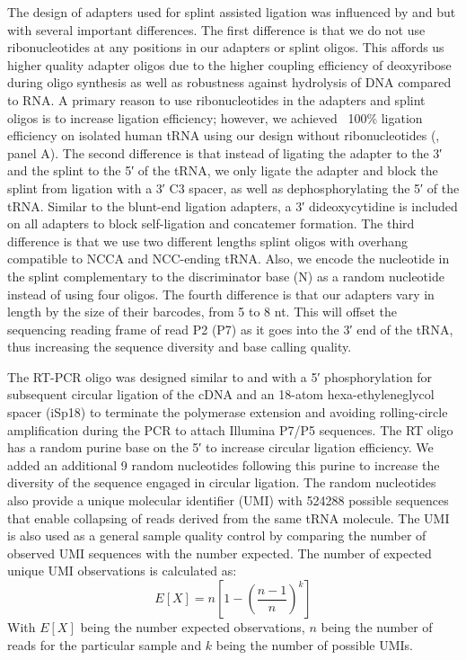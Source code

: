 \documentclass[9pt,lineno]{elife}
\begin{document}
The design of adapters used for splint assisted ligation was influenced by \cite{Smith2015-ht} and \cite{Shigematsu2017-tv} but with several important differences.
The first difference is that we do not use ribonucleotides at any positions in our adapters or splint oligos.
This affords us higher quality adapter oligos due to the higher coupling efficiency of deoxyribose during oligo synthesis as well as robustness against hydrolysis of DNA compared to RNA.
A primary reason to use ribonucleotides in the adapters and splint oligos is to increase ligation efficiency; however, we achieved ~100\% ligation efficiency on isolated human tRNA using our design without ribonucleotides (, panel A).
The second difference is that instead of ligating the adapter to the 3′ and the splint to the 5′ of the tRNA, we only ligate the adapter and block the splint from ligation with a 3′ C3 spacer, as well as dephosphorylating the 5′ of the tRNA.
Similar to the blunt-end ligation adapters, a 3′ dideoxycytidine is included on all adapters to block self-ligation and concatemer formation.
The third difference is that we use two different lengths splint oligos with overhang compatible to NCCA and NCC-ending tRNA.
Also, we encode the nucleotide in the splint complementary to the discriminator base (N) as a random nucleotide instead of using four oligos.
The fourth difference is that our adapters vary in length by the size of their barcodes, from 5 to 8 nt.
This will offset the sequencing reading frame of read P2 (P7) as it goes into the 3′ end of the tRNA, thus increasing the sequence diversity and base calling quality.

The RT-PCR oligo was designed similar to \cite{McGlincy2017-ro} and \cite{Behrens2021-gb} with a 5′ phosphorylation for subsequent circular ligation of the cDNA and an 18-atom hexa-ethyleneglycol spacer (iSp18) to terminate the polymerase extension and avoiding rolling-circle amplification during the PCR to attach Illumina P7/P5 sequences.
The RT oligo has a random purine base on the 5′ to increase circular ligation efficiency.
We added an additional 9 random nucleotides following this purine to increase the diversity of the sequence engaged in circular ligation.
The random nucleotides also provide a unique molecular identifier (UMI) with 524288 possible sequences that enable collapsing of reads derived from the same tRNA molecule.
The UMI is also used as a general sample quality control by comparing the number of observed UMI sequences with the number expected.
The number of expected unique UMI observations is calculated as:
\begin{equation}
E[X] = n \left[ 1 - \left(\frac{n-1}{n} \right)^k \right]
\end{equation}
With $E[X]$ being the number expected observations, $n$ being the number of reads for the particular sample and $k$ being the number of possible UMIs.
\end{document}
